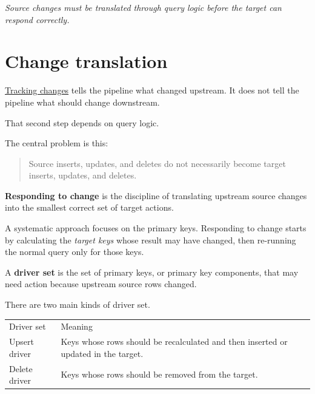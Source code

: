 \documentclass[10pt,openany,10pt]{book}
\newcounter{none}
\let\podeToprule\toprule
\let\podeMidrule\midrule
\let\podeBottomrule\bottomrule
\renewcommand{\toprule}{\arrayrulecolor{pbiGrid}\podeToprule}
\renewcommand{\midrule}{\arrayrulecolor{pbiGrid}\podeMidrule}
\renewcommand{\bottomrule}{\arrayrulecolor{pbiGrid}\podeBottomrule}
\begin{document}
\emph{Source changes must be translated through query logic before the
target can respond correctly.}

\section{Change translation}\label{change-translation}

\hyperref[docs-efficient-stable-pipeline-tracking-changes]{Tracking
changes} tells the pipeline what changed upstream. It does not tell the
pipeline what should change downstream.

That second step depends on query logic.

The central problem is this:

\begin{quote}
Source inserts, updates, and deletes do not necessarily become target
inserts, updates, and deletes.
\end{quote}

\textbf{Responding to change} is the discipline of translating upstream
source changes into the smallest correct set of target actions.

A systematic approach focuses on the primary keys. Responding to change
starts by calculating the \emph{target keys} whose result may have
changed, then re-running the normal query only for those keys.

A \textbf{driver set} is the set of primary keys, or primary key
components, that may need action because upstream source rows changed.

There are two main kinds of driver set.

{\def\LTcaptype{none} %
\begin{longtable}[]{@{}
  >{\raggedright\arraybackslash}p{}
  >{\raggedright\arraybackslash}p{}@{}}
\toprule\noalign{}
\begin{minipage}[b]{\linewidth}\raggedright
Driver set
\end{minipage} & \begin{minipage}[b]{\linewidth}\raggedright
Meaning
\end{minipage} \\
\midrule\noalign{}
\endhead
\bottomrule\noalign{}
\endlastfoot
Upsert driver & Keys whose rows should be recalculated and then inserted
or updated in the target. \\
Delete driver & Keys whose rows should be removed from the target. \\
\end{longtable}
}
\end{document}
